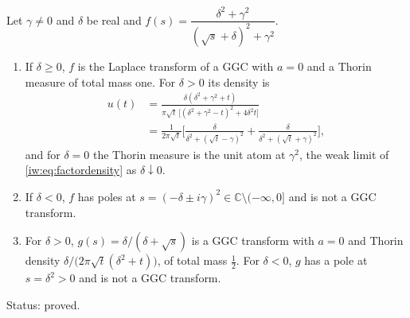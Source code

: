 \begin{lemma}\label{iw:lem:factor}
Let $\gamma\ne0$ and $\delta$ be real and $f(s)=\dfrac{\delta^2+\gamma^2}{(\sqrt s+\delta)^2+\gamma^2}$.
\begin{enumerate}
\item[(i)] If $\delta\ge0$, $f$ is the Laplace transform of a GGC with $a=0$ and a Thorin measure of total mass one. For $\delta>0$ its density is
\begin{equation}\label{iw:eq:factordensity}
\begin{split}
u(t)&=\frac{\delta(\delta^2+\gamma^2+t)}{\pi\sqrt t\,\big[(\delta^2+\gamma^2-t)^2+4\delta^2t\big]}\\
&=\frac1{2\pi\sqrt t}\Big[\frac{\delta}{\delta^2+(\sqrt t-\gamma)^2}+\frac{\delta}{\delta^2+(\sqrt t+\gamma)^2}\Big],
\end{split}
\end{equation}
and for $\delta=0$ the Thorin measure is the unit atom at $\gamma^2$, the weak limit of \eqref{iw:eq:factordensity} as $\delta\downarrow0$.
\item[(ii)] If $\delta<0$, $f$ has poles at $s=(-\delta\pm i\gamma)^2\in\mathbb C\setminus(-\infty,0]$ and is not a GGC transform.
\item[(iii)] For $\delta>0$, $g(s)=\delta/(\delta+\sqrt s)$ is a GGC transform with $a=0$ and Thorin density $\delta/\big(2\pi\sqrt t(\delta^2+t)\big)$, of total mass $\frac12$. For $\delta<0$, $g$ has a pole at $s=\delta^2>0$ and is not a GGC transform.
\end{enumerate}
Status: proved.
\end{lemma}

